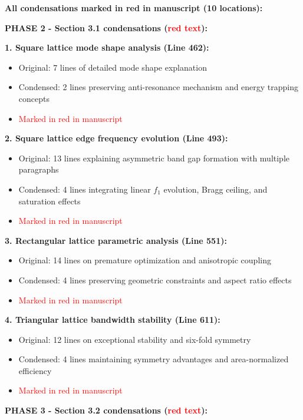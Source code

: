 \documentclass[11pt,a4paper]{article}
\newenvironment{changesbox}{%
    \par\medskip\noindent{\color{changescolor}\rule{\linewidth}{2pt}}\par
    \noindent{\color{changescolor}\bfseries Manuscript Changes}\par\smallskip
}{%
    \par\noindent{\color{changescolor}\rule{\linewidth}{0.5pt}}\medskip
}
\begin{document}
\begin{changesbox}
\textbf{All condensations marked in red in manuscript (10 locations):}

\textbf{PHASE 2 - Section 3.1 condensations (\textcolor{red}{red text}):}

\textbf{1. Square lattice mode shape analysis (Line 462):}
\begin{itemize}
    \item Original: 7 lines of detailed mode shape explanation
    \item Condensed: 2 lines preserving anti-resonance mechanism and energy trapping concepts
    \item \textcolor{red}{Marked in red in manuscript}
\end{itemize}

\textbf{2. Square lattice edge frequency evolution (Line 493):}
\begin{itemize}
    \item Original: 13 lines explaining asymmetric band gap formation with multiple paragraphs
    \item Condensed: 4 lines integrating linear $f_1$ evolution, Bragg ceiling, and saturation effects
    \item \textcolor{red}{Marked in red in manuscript}
\end{itemize}

\textbf{3. Rectangular lattice parametric analysis (Line 551):}
\begin{itemize}
    \item Original: 14 lines on premature optimization and anisotropic coupling
    \item Condensed: 4 lines preserving geometric constraints and aspect ratio effects
    \item \textcolor{red}{Marked in red in manuscript}
\end{itemize}

\textbf{4. Triangular lattice bandwidth stability (Line 611):}
\begin{itemize}
    \item Original: 12 lines on exceptional stability and six-fold symmetry
    \item Condensed: 4 lines maintaining symmetry advantages and area-normalized efficiency
    \item \textcolor{red}{Marked in red in manuscript}
\end{itemize}

\textbf{PHASE 3 - Section 3.2 condensations (\textcolor{red}{red text}):}


\end{changesbox}
\end{document}
